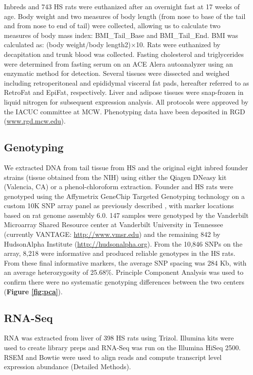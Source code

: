 Inbreds and 743 HS rats were euthanized after an overnight fast at 17 weeks of age. Body weight and two measures of body length (from nose to base of the tail and from nose to end of tail) were collected, allowing us to calculate two measures of body mass index: BMI\_Tail\_Base and BMI\_Tail\_End. BMI was calculated as: (body weight/body length2)$\times$10. Rats were euthanized by decapitation and trunk blood was collected. Fasting cholesterol and triglycerides were determined from fasting serum on an ACE Alera autoanalyzer using an enzymatic method for detection. Several tissues were dissected and weighed including retroperitoneal and epididymal visceral fat pads, hereafter referred to as RetroFat and EpiFat, respectively. Liver and adipose tissues were snap-frozen in liquid nitrogen for subsequent expression analysis. All protocols were approved by the IACUC committee at MCW. Phenotyping data have been deposited in RGD (\url{www.rgd.mcw.edu}).

\subsection{Genotyping}

We extracted DNA from tail tissue from HS and the original eight inbred founder strains (tissue obtained from the NIH) using either the Qiagen DNeasy kit (Valencia, CA) or a phenol-chloroform extraction. Founder and HS rats were genotyped using the Affymetrix GeneChip Targeted Genotyping technology on a custom 10K SNP array panel as previously described \citep{STARConsortium2008}, with marker locations based on rat genome assembly 6.0. 147 samples were genotyped by the Vanderbilt Microarray Shared Resource center at Vanderbilt University in Tennessee (currently VANTAGE: \url{http://www.vmsr.edu}) and the remaining 842 by HudsonAlpha Institute (\url{http://hudsonalpha.org}). From the 10,846 SNPs on the array, 8,218 were informative and produced reliable genotypes in the HS rats. From these final informative markers, the average SNP spacing was 284 Kb, with an average heterozygosity of 25.68\%. Principle Component Analysis was used to confirm there were no systematic genotyping differences between the two centers (\textbf{Figure \ref{fig:pca}}).

\subsection{RNA-Seq}

RNA was extracted from liver of 398 HS rats using Trizol. Illumina kits were used to create library preps and RNA-Seq was run on the Illumina HiSeq 2500. RSEM and Bowtie were used to align reads and compute transcript level expression abundance (Detailed Methods).  


